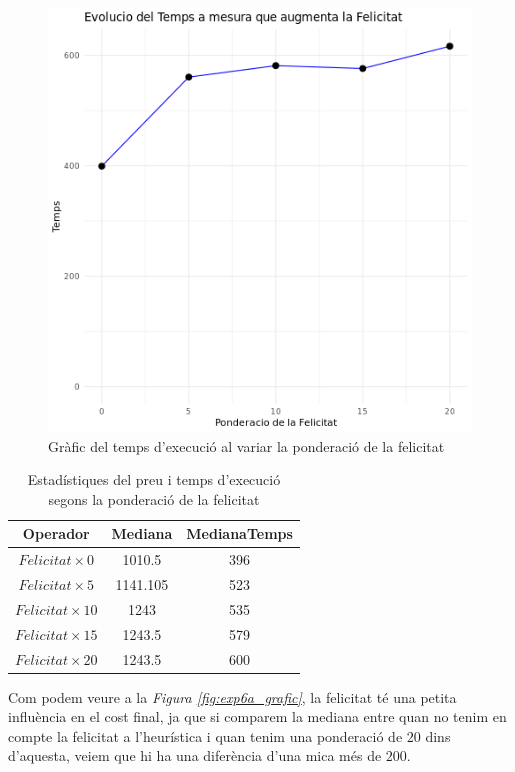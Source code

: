 \documentclass[a4paper]{article}
\begin{document}
\begin{table}[ht]
\begin{figure}[H]
\begin{minipage}{0.45\textwidth}
			\includegraphics[width=\textwidth]{images/exp6b_grafic.png}
			\caption{Gràfic del temps d'execució al variar la ponderació de la felicitat}
			\label{fig:exp6b_grafic}
		\end{minipage}
	\end{figure}
	
	\begin{table}[H]
		\centering
		\begin{tabular}{|c|c|c|}
			\hline
			\textbf{Operador} & \textbf{Mediana} & \textbf{MedianaTemps} \\
			\hline
			$Felicitat \times 0$ & 1010.5 & 396\\
			\hline
			$Felicitat \times 5$ & 1141.105 & 523\\
			\hline
			$Felicitat \times 10$ & 1243 & 535\\
			\hline
			$Felicitat \times 15$ & 1243.5 & 579\\
			\hline
			$Felicitat \times 20$ & 1243.5 & 600\\
			\hline
		\end{tabular}
		\caption{Estadístiques del preu i temps d'execució segons la ponderació de la felicitat}
		\label{tab:exp6_estadisticas}
	\end{table}
	
	Com podem veure a la \textit{Figura \ref{fig:exp6a_grafic}}, la felicitat té una petita influència en el cost final, ja que si comparem la mediana entre quan no tenim en compte la felicitat a l'heurística i quan tenim una ponderació de $20$ dins d'aquesta, veiem que hi ha una diferència d'una mica més de $200$. \\
	

\end{table}
\end{document}
